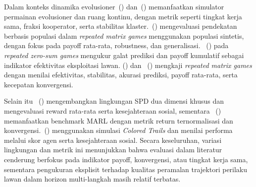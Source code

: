 Dalam konteks dinamika evolusioner~(\cite{di_coupling_2023}) dan~(\cite{elhamer_effects_2020}) memanfaatkan simulator permainan evolusioner dan ruang kontinu, dengan metrik seperti tingkat kerja sama, fraksi kooperator, serta stabilitas klaster.~(\cite{perera_learning_2025}) mengevaluasi pendekatan berbasis populasi dalam \textit{repeated matrix games} menggunakan populasi sintetis, dengan fokus pada payoff rata-rata, robustness, dan generalisasi. ~(\cite{li_exploiting_2025}) pada \textit{repeated zero-sum games} mengukur galat prediksi dan payoff kumulatif sebagai indikator efektivitas eksploitasi lawan. (\cite{freire_modeling_2023}) dan ~(\cite{hu_modeling_2023}) mengkaji \textit{repeated matrix games} dengan menilai efektivitas, stabilitas, akurasi prediksi, payoff rata-rata, serta kecepatan konvergensi.

Selain itu ~(\cite{wang_achieving_2019}) mengembangkan lingkungan SPD dua dimensi khusus dan mengevaluasi reward rata-rata serta kesejahteraan sosial, sementara ~(\cite{jin_achieving_2025}) memanfaatkan benchmark MARL dengan metrik return ternormalisasi dan konvergensi.~(\cite{de_weerd_higher-order_2022}) menggunakan simulasi \textit{Colored Trails} dan menilai performa melalui skor agen serta kesejahteraan sosial. Secara keseluruhan, variasi lingkungan dan metrik ini menunjukkan bahwa evaluasi dalam literatur cenderung berfokus pada indikator payoff, konvergensi, atau tingkat kerja sama, sementara pengukuran eksplisit terhadap kualitas peramalan trajektori perilaku lawan dalam horizon multi-langkah masih relatif terbatas.

